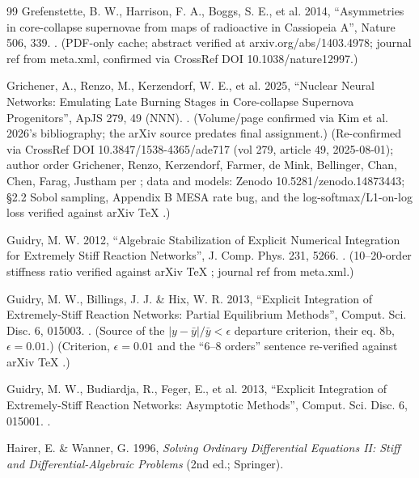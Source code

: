 \begin{thebibliography}{99}
Grefenstette, B. W., Harrison, F. A., Boggs, S. E., et al. 2014, ``Asymmetries in core-collapse supernovae from maps of radioactive  in Cassiopeia A'', Nature 506, 339. . (PDF-only cache; abstract verified at arxiv.org/abs/1403.4978; journal ref from meta.xml, confirmed via CrossRef DOI 10.1038/nature12997.)

Grichener, A., Renzo, M., Kerzendorf, W. E., et al. 2025, ``Nuclear Neural Networks: Emulating Late Burning Stages in Core-collapse Supernova Progenitors'', ApJS 279, 49 (NNN). . (Volume/page confirmed via Kim et al. 2026's bibliography; the arXiv source predates final assignment.) (Re-confirmed via CrossRef DOI 10.3847/1538-4365/ade717 (vol 279, article 49, 2025-08-01); author order Grichener, Renzo, Kerzendorf, Farmer, de Mink, Bellinger, Chan, Chen, Farag, Justham per ; data and models: Zenodo 10.5281/zenodo.14873443; \S 2.2 Sobol sampling, Appendix B MESA rate bug, and the log-softmax/L1-on-log loss verified against arXiv TeX .)

Guidry, M. W. 2012, ``Algebraic Stabilization of Explicit Numerical Integration for Extremely Stiff Reaction Networks'', J. Comp. Phys. 231, 5266. . (10--20-order stiffness ratio verified against arXiv TeX ; journal ref from meta.xml.)

Guidry, M. W., Billings, J. J. \& Hix, W. R. 2013, ``Explicit Integration of Extremely-Stiff Reaction Networks: Partial Equilibrium Methods'', Comput. Sci. Disc. 6, 015003. . (Source of the $|y - \bar y|/\bar y < \epsilon$ departure criterion, their eq. 8b, $\epsilon = 0.01$.) (Criterion, $\epsilon = 0.01$ and the ``6--8 orders'' sentence re-verified against arXiv TeX .)

Guidry, M. W., Budiardja, R., Feger, E., et al. 2013, ``Explicit Integration of Extremely-Stiff Reaction Networks: Asymptotic Methods'', Comput. Sci. Disc. 6, 015001. .

Hairer, E. \& Wanner, G. 1996, \emph{Solving Ordinary Differential Equations II: Stiff and Differential-Algebraic Problems} (2nd ed.; Springer).


\end{thebibliography}
